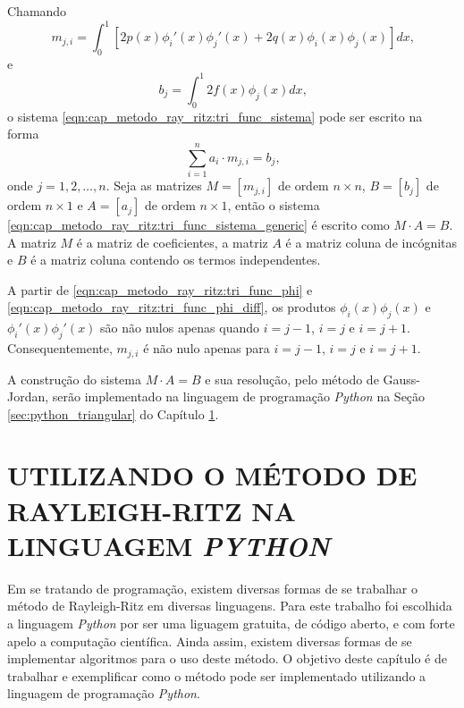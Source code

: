 \documentclass[
	12pt,				%
	openright,			%
    twoside,			%
	a4paper,			%
	chapter=TITLE,		%
	english,			%
	french,				%
	spanish,			%
	brazil				%
	]{abntex2}
\numberwithin{lema}{chapter}
\numberwithin{teorema}{chapter}
\numberwithin{definicao}{chapter}
\numberwithin{exemplo}{chapter}
\numberwithin{figure}{chapter}
\begin{document}
Chamando
\begin{equation}
	\label{eqn:cap_metodo_ray_ritz:tri_func_mji}
	m_{j,i}=\int_{0}^{1} \left [
		2p(x)\phi_i'(x)\phi_j'(x)
		+
		2q(x)\phi_i(x)\phi_j(x)
	\right ]dx
	\text{,}
\end{equation}
e
\begin{equation}
	\label{eqn:cap_metodo_ray_ritz:tri_func_bj}
	b_j=\int_{0}^{1} 2f(x)\phi_j(x)dx
	\text{,}
\end{equation}
o sistema \eqref{eqn:cap_metodo_ray_ritz:tri_func_sistema} pode ser escrito na forma 
\begin{equation}
	\label{eqn:cap_metodo_ray_ritz:tri_func_sistema_generic}
	\displaystyle\sum_{i=1}^n a_i\cdot m_{j,i}=b_j
	\text{,}
\end{equation}
onde $j=1,2,\dots,n$. Seja as matrizes $M=[m_{j,i}]$ de ordem $n\times n$, $B=[b_j]$ de ordem $n\times 1$ e $A=[a_j]$ de ordem $n\times 1$, então o sistema \eqref{eqn:cap_metodo_ray_ritz:tri_func_sistema_generic} é escrito como $M\cdot A=B$. A matriz $M$ é a matriz de coeficientes, a matriz $A$ é a matriz coluna de incógnitas e $B$ é a matriz coluna contendo os termos independentes.

A partir de \eqref{eqn:cap_metodo_ray_ritz:tri_func_phi} e \eqref{eqn:cap_metodo_ray_ritz:tri_func_phi_diff}, os produtos $\phi_i(x)\phi_j(x)$ e $\phi_i'(x)\phi_j'(x)$ são não nulos apenas quando $i=j-1$, $i=j$ e $i=j+1$. Consequentemente, $m_{j,i}$ é não nulo apenas para $i=j-1$, $i=j$ e $i=j+1$.

A construção do sistema $M\cdot A=B$ e sua resolução, pelo método de Gauss-Jordan, serão implementado na linguagem de programação \textit{Python} na Seção \ref{sec:python_triangular} do Capítulo \ref{cap:python}.

\chapter{UTILIZANDO O MÉTODO DE RAYLEIGH-RITZ NA LINGUAGEM \textit{PYTHON}}
\label{cap:python}

Em se tratando de programação, existem diversas formas de se trabalhar o método de Rayleigh-Ritz em diversas linguagens. Para este trabalho foi escolhida a linguagem \textit{Python} por ser uma liguagem gratuita, de código aberto, e com forte apelo a computação científica. Ainda assim, existem diversas formas de se implementar algoritmos para o uso deste método. O objetivo deste capítulo é de trabalhar e exemplificar como o método pode ser implementado utilizando a linguagem de programação \textit{Python}.
\end{document}
